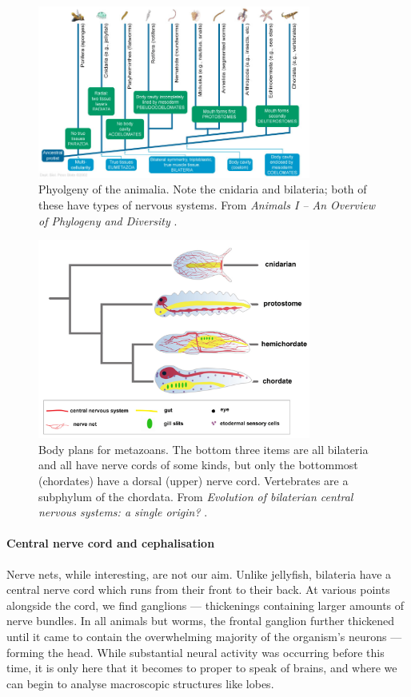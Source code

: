 \begin{figure}
	\centering
	\includegraphics[width=0.8\textwidth]{Figs/animalia.jpg}
	\caption{Phyolgeny of the animalia. Note the cnidaria and bilateria; both of these have types of nervous systems. From {\em Animals I -- An Overview of Phylogeny and Diversity} \cite{animalia}.}
	\label{fig:animalia}
\end{figure}

\begin{figure}
	\centering
	\includegraphics[width=0.8\textwidth]{Figs/chordata.jpg}
	\caption{Body plans for metazoans. The bottom three items are all bilateria and all have nerve cords of some kinds, but only the bottommost (chordates) have a dorsal (upper) nerve cord. Vertebrates are a subphylum of the chordata. From {\em Evolution of bilaterian central nervous systems: a single origin?} \cite[p. 3]{chordata}.}
	\label{fig:chordata}
\end{figure}

\paragraph{Central nerve cord and cephalisation} Nerve nets, while interesting, are not our aim. Unlike jellyfish, bilateria have a central nerve cord which runs from their front to their back. At various points alongside the cord, we find ganglions --- thickenings containing larger amounts of nerve bundles. In all animals but worms, the frontal ganglion further thickened until it came to contain the overwhelming majority of the organism's neurons --- forming the head. While substantial neural activity was occurring before this time, it is only here that it becomes to proper to speak of brains, and where we can begin to analyse macroscopic structures like lobes.

